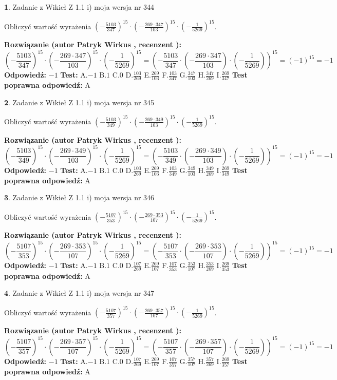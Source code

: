 \documentclass[12pt, a4paper]{article}
\theoremstyle{definition} %
\newtheorem{zad}{}
\newcommand{\zadStart}[1]{\begin{zad}#1\newline}
\newcommand{\zadStop}{\end{zad}}
\newcommand{\rozwStart}[2]{\noindent \textbf{Rozwiązanie (autor #1 , recenzent #2): }\newline}
\newcommand{\rozwStop}{\newline}
\newcommand{\odpStart}{\noindent \textbf{Odpowiedź:}\newline}
\newcommand{\odpStop}{\newline}
\newcommand{\testStart}{\noindent \textbf{Test:}\newline}
\newcommand{\testStop}{\newline}
\newcommand{\kluczStart}{\noindent \textbf{Test poprawna odpowiedź:}\newline}
\newcommand{\kluczStop}{\newline}
\begin{document}
\zadStart{Zadanie z Wikieł Z 1.1 i) moja wersja nr 344}

Obliczyć wartość wyrażenia $(-\frac{5103}{347})^{15} \cdot (-\frac{269 \cdot 347}{103})^{15} \cdot (-\frac{1}{5269})^{15}$.
\zadStop
\rozwStart{Patryk Wirkus}{}
$$(-\frac{5103}{347})^{15} \cdot (-\frac{269 \cdot 347}{103})^{15} \cdot (-\frac{1}{5269})^{15} = (-\frac{5103}{347} \cdot (-\frac{269 \cdot 347}{103}) \cdot (-\frac{1}{5269}))^{15} = (-1)^{15} = -1$$
\rozwStop
\odpStart
$-1$
\odpStop
\testStart
A.$-1$ B.$1$ C.$0$ D.$\frac{103}{269}$ E.$\frac{269}{103}$
F.$\frac{103}{347}$ G.$\frac{347}{103}$
H.$\frac{347}{269}$
I.$\frac{269}{347}$
\testStop
\kluczStart
A
\kluczStop



\zadStart{Zadanie z Wikieł Z 1.1 i) moja wersja nr 345}

Obliczyć wartość wyrażenia $(-\frac{5103}{349})^{15} \cdot (-\frac{269 \cdot 349}{103})^{15} \cdot (-\frac{1}{5269})^{15}$.
\zadStop
\rozwStart{Patryk Wirkus}{}
$$(-\frac{5103}{349})^{15} \cdot (-\frac{269 \cdot 349}{103})^{15} \cdot (-\frac{1}{5269})^{15} = (-\frac{5103}{349} \cdot (-\frac{269 \cdot 349}{103}) \cdot (-\frac{1}{5269}))^{15} = (-1)^{15} = -1$$
\rozwStop
\odpStart
$-1$
\odpStop
\testStart
A.$-1$ B.$1$ C.$0$ D.$\frac{103}{269}$ E.$\frac{269}{103}$
F.$\frac{103}{349}$ G.$\frac{349}{103}$
H.$\frac{349}{269}$
I.$\frac{269}{349}$
\testStop
\kluczStart
A
\kluczStop



\zadStart{Zadanie z Wikieł Z 1.1 i) moja wersja nr 346}

Obliczyć wartość wyrażenia $(-\frac{5107}{353})^{15} \cdot (-\frac{269 \cdot 353}{107})^{15} \cdot (-\frac{1}{5269})^{15}$.
\zadStop
\rozwStart{Patryk Wirkus}{}
$$(-\frac{5107}{353})^{15} \cdot (-\frac{269 \cdot 353}{107})^{15} \cdot (-\frac{1}{5269})^{15} = (-\frac{5107}{353} \cdot (-\frac{269 \cdot 353}{107}) \cdot (-\frac{1}{5269}))^{15} = (-1)^{15} = -1$$
\rozwStop
\odpStart
$-1$
\odpStop
\testStart
A.$-1$ B.$1$ C.$0$ D.$\frac{107}{269}$ E.$\frac{269}{107}$
F.$\frac{107}{353}$ G.$\frac{353}{107}$
H.$\frac{353}{269}$
I.$\frac{269}{353}$
\testStop
\kluczStart
A
\kluczStop



\zadStart{Zadanie z Wikieł Z 1.1 i) moja wersja nr 347}

Obliczyć wartość wyrażenia $(-\frac{5107}{357})^{15} \cdot (-\frac{269 \cdot 357}{107})^{15} \cdot (-\frac{1}{5269})^{15}$.
\zadStop
\rozwStart{Patryk Wirkus}{}
$$(-\frac{5107}{357})^{15} \cdot (-\frac{269 \cdot 357}{107})^{15} \cdot (-\frac{1}{5269})^{15} = (-\frac{5107}{357} \cdot (-\frac{269 \cdot 357}{107}) \cdot (-\frac{1}{5269}))^{15} = (-1)^{15} = -1$$
\rozwStop
\odpStart
$-1$
\odpStop
\testStart
A.$-1$ B.$1$ C.$0$ D.$\frac{107}{269}$ E.$\frac{269}{107}$
F.$\frac{107}{357}$ G.$\frac{357}{107}$
H.$\frac{357}{269}$
I.$\frac{269}{357}$
\testStop
\kluczStart
A
\kluczStop
\end{document}
